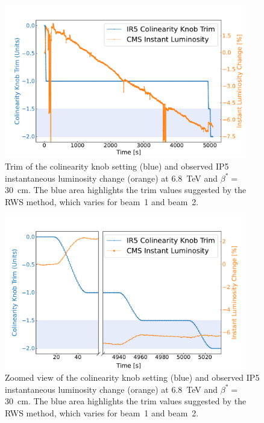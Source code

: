 \begin{figure}[!htb]
    \centering
    \includegraphics*[width=0.94\textwidth]{Figures/IR_Coupling_Correction/corrections_trim_ir5.pdf}
    \caption{Trim of the colinearity knob setting (\textcolor{mplblue}{blue}) and observed IP\num{5} instantaneous luminosity change (\textcolor{mplorange}{orange}) at \qty{6.8}{\tera\electronvolt} and \(\beta^{\ast} = \) \qty{30}{cm}. The blue area highlights the trim values suggested by the RWS method, which varies for beam~\num{1} and beam~\num{2}.}
    \label{figure:corrections_trims_ir5}
\end{figure}

\begin{figure}[!htb]
    \centering
    \includegraphics*[width=0.94\textwidth]{Figures/IR_Coupling_Correction/corrections_trim_ir5_split.pdf}
    \caption{Zoomed view of the colinearity knob setting (\textcolor{mplblue}{blue}) and observed IP\num{5} instantaneous luminosity change (\textcolor{mplorange}{orange}) at \qty{6.8}{\tera\electronvolt} and \(\beta^{\ast} = \) \qty{30}{cm}. The blue area highlights the trim values suggested by the RWS method, which varies for beam~\num{1} and beam~\num{2}.}
    \label{figure:corrections_trims_ir5_zoomed}
\end{figure}

